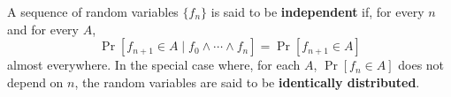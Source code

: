 A sequence of random variables $\{f_n\}$ is said to be \textbf{independent} if, for every $n$ and for every $A$, $$\Pr[f_{n+1} \in A \mid f_0 \wedge \cdots \wedge f_n] = \Pr[f_{n+1} \in A]$$ almost everywhere. In the special case where, for each $A$, $\Pr[f_n \in A]$ does not depend on $n$, the random variables are said to be \textbf{identically distributed}.